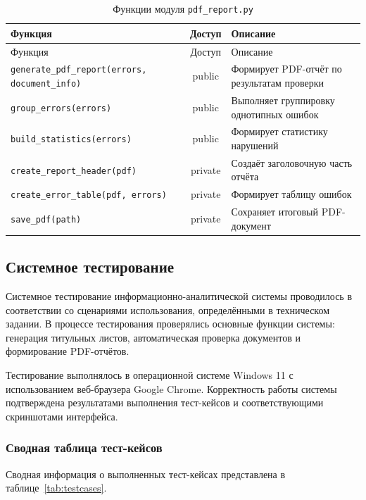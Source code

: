 \begin{xltabular}{\textwidth}{|>{\raggedright\arraybackslash}p{6cm}|c|X|}
	\caption{Функции модуля \texttt{pdf\_report.py}\label{tab:module_pdfreport}}\\ \hline
	\centrow Функция & \centrow Доступ & \centrow Описание \\ \hline
	\endfirsthead
	\centrow Функция & \centrow Доступ & \centrow Описание \\ \hline
	\finishhead
	\texttt{generate\_pdf\_report(errors, document\_info)} & public & Формирует PDF-отчёт по результатам проверки \\ \hline
	\texttt{group\_errors(errors)} & public & Выполняет группировку однотипных ошибок \\ \hline
	\texttt{build\_statistics(errors)} & public & Формирует статистику нарушений \\ \hline
	\texttt{create\_report\_header(pdf)} & private & Создаёт заголовочную часть отчёта \\ \hline
	\texttt{create\_error\_table(pdf, errors)} & private & Формирует таблицу ошибок \\ \hline
	\texttt{save\_pdf(path)} & private & Сохраняет итоговый PDF-документ \\ \hline
\end{xltabular}

\subsection{Системное тестирование}

Системное тестирование информационно-аналитической системы проводилось в соответствии со сценариями использования, определёнными в техническом задании. В процессе тестирования проверялись основные функции системы: генерация титульных листов, автоматическая проверка документов и формирование PDF-отчётов.

Тестирование выполнялось в операционной системе Windows 11 с использованием веб-браузера Google Chrome. Корректность работы системы подтверждена результатами выполнения тест-кейсов и соответствующими скриншотами интерфейса.

\subsubsection{Сводная таблица тест-кейсов}

Сводная информация о выполненных тест-кейсах представлена в таблице~\ref{tab:testcases}.

